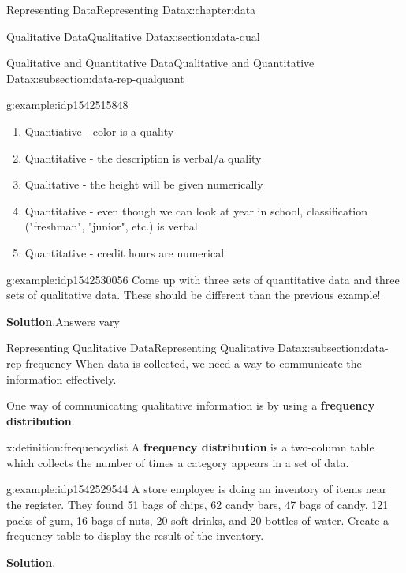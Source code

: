 \documentclass[oneside,10pt,]{book}
\newcommand{\blocktitlefont}{\relax}
\newcommand{\terminology}[1]{\textbf{#1}}
\begin{document}
\begin{chapterptx}{Representing Data}{}{Representing Data}{}{}{x:chapter:data}
\begin{sectionptx}{Qualitative Data}{}{Qualitative Data}{}{}{x:section:data-qual}
\begin{subsectionptx}{Qualitative and Quantitative Data}{}{Qualitative and Quantitative Data}{}{}{x:subsection:data-rep-qualquant}
\begin{example}{}{g:example:idp1542515848}
\noindent\hypertarget{g:solution:idp1542518152}{}%
\begin{enumerate}[label=\alph*]
\item{}Quantiative - color is a quality%
\item{}Quantitative - the description is verbal\slash{}a quality%
\item{}Qualitative - the height will be given numerically%
\item{}Quantitative - even though we can look at year in school, classification ("freshman", "junior", etc.) is verbal%
\item{}Quantitative - credit hours are numerical%
\end{enumerate}
%
\end{example}
\begin{example}{}{g:example:idp1542530056}%
Come up with three sets of quantitative data and three sets of qualitative data.  These should be different than the previous example!%
\par\smallskip%
\noindent\textbf{\blocktitlefont Solution}.\hypertarget{g:solution:idp1542526984}{}\quad{}Answers vary%
\end{example}
\end{subsectionptx}
%
%
\typeout{************************************************}
\typeout{************************************************}
%
\begin{subsectionptx}{Representing Qualitative Data}{}{Representing Qualitative Data}{}{}{x:subsection:data-rep-frequency}
When data is collected, we need a way to communicate the information effectively.%
\par
One way of communicating qualitative information is by using a \terminology{frequency distribution}.%
\begin{definition}{}{x:definition:frequencydist}%
A \terminology{frequency distribution} is a two-column table which collects the number of times a category appears in a set of data.%
%
\end{definition}
\begin{example}{}{g:example:idp1542529544}%
A store employee is doing an inventory of items near the register.  They found 51 bags of chips, 62 candy bars, 47 bags of candy, 121 packs of gum, 16 bags of nuts, 20 soft drinks, and 20 bottles of water.  Create a frequency table to display the result of the inventory.\par\smallskip%
\noindent\textbf{\blocktitlefont Solution}.\hypertarget{g:solution:idp1542528264}{}\quad{}\begin{center}%

\end{center}
\end{example}
\end{subsectionptx}
\end{sectionptx}
\end{chapterptx}
\end{document}
